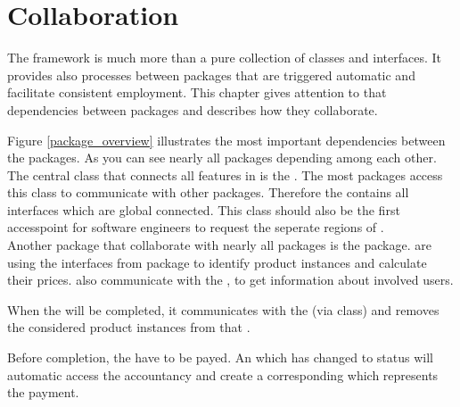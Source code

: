 \chapter{Collaboration}

The \salespoint{} framework is much more than a pure collection of classes and interfaces. It provides also processes between packages that are triggered automatic and facilitate consistent employment. This chapter gives attention to that dependencies between packages and describes how they collaborate.  

Figure \ref{package_overview} illustrates the most important dependencies between the \salespoint{} packages. As you can see nearly all packages depending among each other.\\ 

The central class that connects all features in \salespoint{} is the . The most packages access this class to communicate with other packages. Therefore the  contains all interfaces which are global connected. This class should also be the first accesspoint for software engineers to request the seperate regions of \salespoint{}.\\ 

Another package that collaborate with nearly all packages is the  package.  are using the interfaces from  package to identify product instances and calculate their prices.  also communicate with the , to get information about involved users.\par 
When the  will be completed, it communicates with the  (via  class) and removes the considered product instances from that . \par
Before completion, the  have to be payed. An  which has changed to status  will automatic access the accountancy and create a corresponding  which represents the payment.\\ 




